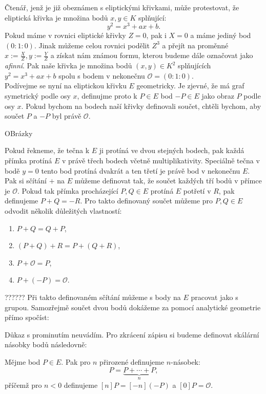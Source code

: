 \documentclass [12pt]{report}
\begin{document}
Čtenář, jenž je již obeznámen s eliptickými křivkami, může protestovat, že eliptická křivka je množina bodů $x,y \in K$ splňující:
\begin{equation*}
y^2 = x^3 + a x + b.
\end{equation*}
Pokud máme v rovnici eliptické křivky $Z=0$, pak i $X = 0$ a máme jediný bod $(0:1:0)$. Jinak můžeme celou rovnici podělit $Z^3$ a přejít na proměnné $x := \frac{X}{Z}, y := \frac{Y}{Z}$ a získat nám známou formu, kterou budeme dále označovat jako \textit{afinní}. Pak naše křivka je množina bodů $(x,y) \in K^2$ splňujících $y^2 = x^3 + a x + b$ spolu s bodem v nekonečnu $\mathcal{O} = (0:1:0)$.\\

Podívejme se nyní na eliptickou křivku $E$ geometricky. Je zjevné, že má graf symetrický podle osy $x$, definujme proto k $P \in E$ bod $-P \in E$ jako obraz $P$ podle osy $x$. Pokud bychom na bodech naší křivky definovali součet, chtěli bychom, aby součet $P$ a $-P$ byl právě $\mathcal{O}$.

OBrázky

Pokud řekneme, že tečna k $E$ ji protíná ve dvou stejných bodech, pak každá přímka protíná $E$ v právě třech bodech včetně multiplikativity. Speciálně tečna v bodě $y=0$ tento bod protíná dvakrát a ten třetí je právě bod v nekonečnu $E$. Pak si sčítání $+$ na $E$ můžeme definovat tak, že součet každých tří bodů v přímce je $\mathcal{O}$. Pokud tak přímka procházející $P,Q \in E$ protíná $E$ potřetí v $R$, pak definujeme $P+ Q = -R$. Pro takto definovaný součet můžeme pro $P,Q \in E$ odvodit několik důležitých vlastností:
\begin{enumerate}
\item $P + Q = Q + P$,
\item $(P + Q) + R =P + ( Q + R)$,
\item $P + \mathcal{O} = P$,
\item $P + (-P) = \mathcal{O}$.
\end{enumerate} 

?????? Při takto definovaném sčítání můžeme s body na $E$ pracovat jako s grupou. Samozřejmě součet dvou bodů dokážeme za pomocí analytické geometrie přímo spočíst:
\begin{veta}

\end{veta}
Důkaz s prominutím neuvádím. Pro zkrácení zápisu si budeme definovat skálární násobky bodů následovně:
\begin{definice}
Mějme bod $P \in E$. Pak pro $n$ přirozené definujeme $n$-násobek:
\begin{equation*}
[n] P = \underbrace{P+ \cdots + P}_{n},
\end{equation*}
příčemž pro $n < 0$ definujeme $[n]P = [-n] (-P)$ a $[0] P = \mathcal{O}$.
\end{definice}
\end{document}

